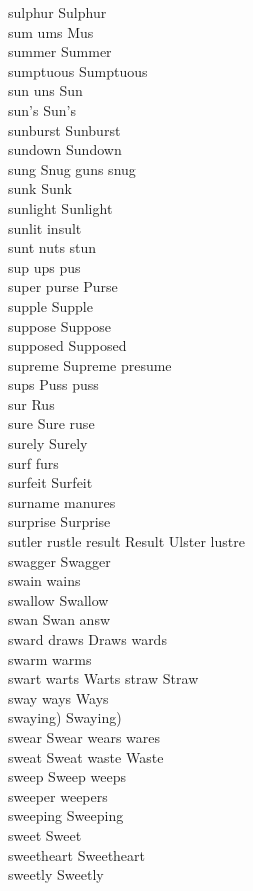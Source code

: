 sulphur Sulphur\\
sum ums Mus\\
summer Summer\\
sumptuous Sumptuous\\
sun uns Sun\\
sun's Sun's\\
sunburst Sunburst\\
sundown Sundown\\
sung Snug guns snug\\
sunk Sunk\\
sunlight Sunlight\\
sunlit insult\\
sunt nuts stun\\
sup ups pus\\
super purse Purse\\
supple Supple\\
suppose Suppose\\
supposed Supposed\\
supreme Supreme presume\\
sups Puss puss\\
sur Rus\\
sure Sure ruse\\
surely Surely\\
surf furs\\
surfeit Surfeit\\
surname manures\\
surprise Surprise\\
sutler rustle result Result Ulster lustre\\
swagger Swagger\\
swain wains\\
swallow Swallow\\
swan Swan answ\\
sward draws Draws wards\\
swarm warms\\
swart warts Warts straw Straw\\
sway ways Ways\\
swaying) Swaying)\\
swear Swear wears wares\\
sweat Sweat waste Waste\\
sweep Sweep weeps\\
sweeper weepers\\
sweeping Sweeping\\
sweet Sweet\\
sweetheart Sweetheart\\
sweetly Sweetly\\
